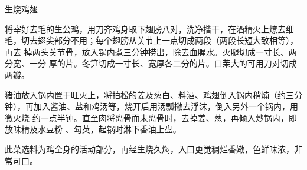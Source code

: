 \begin{recipe}[生烧大转弯]{生烧鸡翅}

\ingredients


\preparation

\step 将宰好去毛的生公鸡，用刀齐鸡身取下翅膀八对，洗净揩干，在酒精火上燎去细
毛，切去翅尖部分不用；每个翅膀从关节上一点切成两段（两段长短大致相等），再去
掉两头关节骨，放入锅内煮三分钟捞出，除去血腥水。火腿切成一寸长、两分宽、一分
厚的片。冬笋切成一寸长、宽厚各二分的片。口茉大的可用刀对切成两瓣。

\step 猪油放入锅内置于旺火上，将拍松的姜及葱白、料酒、鸡翅倒入锅内稍煵（约三分
钟），再加入酱油、盐和鸡汤等，烧开后用汤瓢撇去浮沫，倒入另外一个锅内，用微火烧
约一点半钟。直至肉将离骨而未离骨时，去掉姜、葱，再倾入炒锅内，即放味精及水豆粉
、勾芡，起锅时淋下香油上盘。

\features

此菜选料为鸡全身的活动部分，再经生烧久焖，入口更觉稠烂香嫩，色鲜味浓，非常可口。

\end{recipe}

